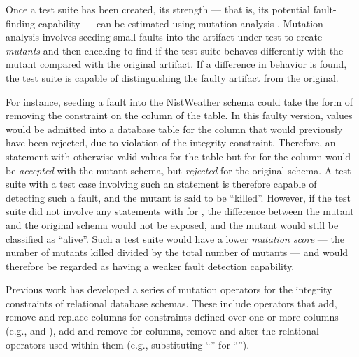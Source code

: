 Once a test suite has been created, its strength --- that is, its potential fault-finding capability --- can be estimated using mutation analysis \cite{Jia2011}. Mutation analysis involves seeding small faults into the artifact under test to create {\it mutants} and then checking to find if the test suite behaves differently with the mutant compared with the original artifact. If a difference in behavior is found, the test suite is capable of distinguishing the faulty artifact from the original.

For instance, seeding a fault into the NistWeather schema could take the form of removing the \NOTNULL constraint on the  column of the  table. In this faulty version, \NULL values would be admitted into a database table for the  column that would previously have been rejected, due to violation of the integrity constraint. Therefore, an \INSERT statement with otherwise valid values for the  table but for \NULL for the  column would be {\it accepted} with the mutant schema, but {\it rejected} for the original schema. A test suite with a test case involving such an \INSERT statement is therefore capable of detecting such a fault, and the mutant is said to be ``killed''. However, if the test suite did not involve any \INSERT statements with \NULL for , the difference between the mutant and the original schema would not be exposed, and the mutant would still be classified as ``alive''. Such a test suite would have a lower {\it mutation score} --- the number of mutants killed divided by the total number of mutants --- and would therefore be regarded as having a weaker fault detection capability.

Previous work \cite{Kapfhammer2013,Wright2013,Wright2014} has developed a series of mutation operators for the integrity constraints of relational database schemas. These include operators that add, remove and replace columns for constraints defined over one or more columns (e.g., \PK and \FKCs), add and remove \NNCs for columns, remove \CCs and alter the relational operators used within them (e.g., substituting ``\sql{>}'' for ``\sql{>=}'').

